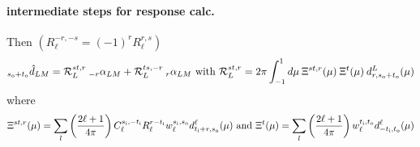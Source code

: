 \documentclass{article}
\newcommand{\si}[0]{{s_{\rm i}}}
\newcommand{\ti}[0]{{t_{\rm i}}}
\newcommand{\so}[0]{{s_{\rm o}}}
\renewcommand{\to}[0]{{t_{\rm o}}}
\begin{document}
\paragraph{intermediate steps for response calc.}
Then $\left( R_\ell^{-r, -s} = (-1)^r R_\ell^{r,s} \right)$
\begin{equation}
	_{\so + \to} \hat d_{LM} = \mathcal R^{st, r}_L \: _{-r}\alpha_{LM} +   \mathcal R_L^{ts, -r} \: _{r}\alpha_{LM} \textrm{  with  } \mathcal R_L^{st, r} = 2\pi \int_{-1}^1d\mu\:\Xi^{st, r}(\mu)\:\Xi^{t}(\mu) \:d^L_{r, \so + \to}(\mu)
\end{equation}
where
\begin{equation}
	\Xi^{st, r}(\mu) = \sum_{l}\left(\frac{2\ell + 1}{4\pi}\right) C_\ell^{\si,-\ti} R^{r - \ti}_\ell w^{\si,\so}_\ell d^\ell_{\ti + r, \so}(\mu) \textrm{  and   } \Xi^{t}(\mu) = \sum_{l}\left(\frac{2\ell + 1}{4\pi}\right) w^{\ti,\to}_\ell d^\ell_{-\ti, \to}(\mu)
\end{equation}
\end{document}
